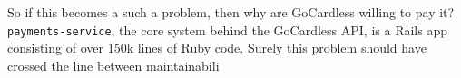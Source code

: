 \documentclass[11pt]{article}
\begin{document}
So if this becomes a such a problem, then why are GoCardless willing to pay it?
\texttt{payments-service}, the core system behind the GoCardless API, is a Rails app
consisting of over 150k lines of Ruby code. Surely this problem should have
crossed the line between maintainabili


\medskip
{}

\newpage
\end{document}
